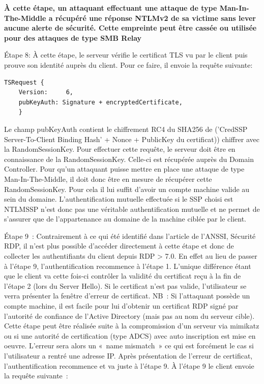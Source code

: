 \textbf{À cette \'etape, un attaquant effectuant une attaque de type Man-In-The-Middle a récupéré une réponse NTLMv2 de sa victime sans lever aucune alerte de sécurité. Cette empreinte peut être cassée ou utilisée pour des attaques de type SMB Relay}

Étape 8: À cette \'etape, le serveur vérifie le certificat TLS vu par le client puis prouve son identité auprès du client. Pour ce faire, il envoie la requête suivante:

\begin{lstlisting}[frame=single,basicstyle=\tiny]
TSRequest {
	Version:     6,
	pubKeyAuth: Signature + encryptedCertificate,
	}
\end{lstlisting}

Le champ pubKeyAuth contient le chiffrement RC4 du SHA256 de (’CredSSP Server-To-Client Binding Hash’ + Nonce + PublicKey du certificat)) chiffrer avec la RandomSessionKey.
Pour effectuer cette requête, le serveur doit être en connaissance de la RandomSessionKey. Celle-ci est r\'ecupérée auprès du Domain Controller. Pour qu’un attaquant puisse mettre en place une attaque de type Man-In-The-Middle, il doit donc être en mesure de récupérer cette RandomSessionKey. Pour cela il lui suffit d’avoir un compte machine valide au sein du domaine.
L’authentification mutuelle effectu\'ee si le SSP choisi est NTLMSSP n’est donc pas une véritable authentification mutuelle et ne permet de s'assurer que de l'appartenance au domaine de la machine ciblée par le client.

Étape 9 :
Contrairement à ce qui \'eté identifié dans l'article de l’ANSSI, Sécurité RDP, il n’est plus possible d’accéder directement à cette étape et donc de collecter les authentifiants du client depuis RDP > 7.0.
En effet au lieu de passer à l’\'etape 9, l’authentification recommence à l’étape 1. L'unique différence étant que le client va cette fois-ci contrôler la validité du certificat reçu à la fin de l’étape 2 (lors du Server Hello). Si le certificat n'est pas valide, l'utilisateur se verra présenter la fenêtre d'erreur de certificat.
NB : Si l’attaquant possède un compte machine, il est facile pour lui d’obtenir un certificat RDP sign\'e par l’autorité de confiance de l’Active Directory (mais pas au nom du serveur cible). Cette étape peut être réalisée suite à la compromission d'un serveur via mimikatz ou si une autorité de certification (type ADCS) avec auto inscription est mise en oeuvre. L’erreur sera alors un « name mismatch » ce qui est forcément le cas si l’utilisateur a rentré une adresse IP.
Après pr\'esentation de l’erreur de certificat, l’authentification recommence et va juste à l’étape 9.
À l’\'etape 9 le client envoie la requête suivante :

